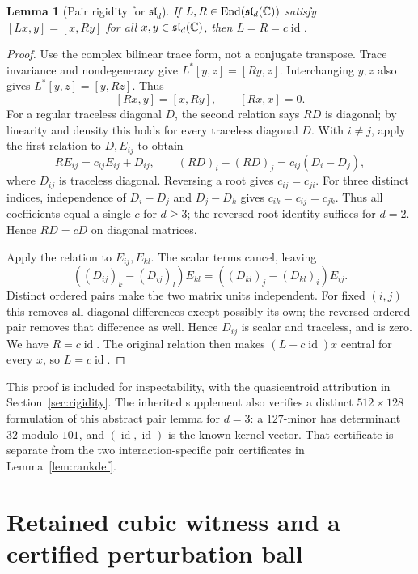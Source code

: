 \documentclass[11pt,a4paper]{article}
\numberwithin{equation}{section}
\newtheorem{lemma}[theorem]{Lemma}
\theoremstyle{definition}\newtheorem{definition}[theorem]{Definition}
\theoremstyle{remark}\newtheorem{remark}[theorem]{Remark}
\DeclareMathOperator{\End}{End}\DeclareMathOperator{\len}{len}
\newcommand{\g}{\mathfrak{sl}_d(\C)}\newcommand{\id}{\operatorname{id}}
\begin{document}
\begin{lemma}[Pair rigidity for $\mathfrak{sl}_d$]\label{lem:pair}
If $L,R\in\End(\g)$ satisfy $[Lx,y]=[x,Ry]$ for all $x,y\in\g$, then $L=R=c\id$.
\end{lemma}
\begin{proof}
Use the complex bilinear trace form, not a conjugate transpose. Trace invariance and nondegeneracy give $L^*[y,z]=[Ry,z]$. Interchanging $y,z$ also gives $L^*[y,z]=[y,Rz]$. Thus
\[
 [Rx,y]=[x,Ry],\qquad [Rx,x]=0.
\]
For a regular traceless diagonal $D$, the second relation says $RD$ is diagonal; by linearity and density this holds for every traceless diagonal $D$. With $i\ne j$, apply the first relation to $D,E_{ij}$ to obtain
\[
 RE_{ij}=c_{ij}E_{ij}+D_{ij},\qquad
 (RD)_i-(RD)_j=c_{ij}(D_i-D_j),
\]
where $D_{ij}$ is traceless diagonal. Reversing a root gives $c_{ij}=c_{ji}$. For three distinct indices, independence of $D_i-D_j$ and $D_j-D_k$ gives $c_{ik}=c_{ij}=c_{jk}$. Thus all coefficients equal a single $c$ for $d\ge3$; the reversed-root identity suffices for $d=2$. Hence $RD=cD$ on diagonal matrices.

Apply the relation to $E_{ij},E_{kl}$. The scalar terms cancel, leaving
\[
 ((D_{ij})_k-(D_{ij})_l)E_{kl}
 =((D_{kl})_j-(D_{kl})_i)E_{ij}.
\]
Distinct ordered pairs make the two matrix units independent. For fixed $(i,j)$ this removes all diagonal differences except possibly its own; the reversed ordered pair removes that difference as well. Hence $D_{ij}$ is scalar and traceless, and is zero. We have $R=c\id$. The original relation then makes $(L-c\id)x$ central for every $x$, so $L=c\id$.
\end{proof}

This proof is included for inspectability, with the quasicentroid attribution in Section~\ref{sec:rigidity}. The inherited supplement also verifies a distinct $512\times128$ formulation of this abstract pair lemma for $d=3$: a $127$-minor has determinant $32$ modulo $101$, and $(\id,\id)$ is the known kernel vector. That certificate is separate from the two interaction-specific pair certificates in Lemma~\ref{lem:rankdef}.

\section{Retained cubic witness and a certified perturbation ball}\label{app:old}
\end{document}
